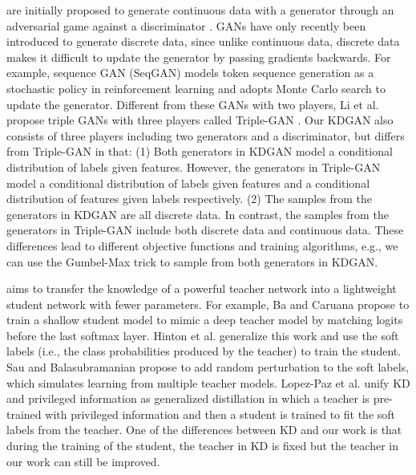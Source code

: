 \documentclass{article}
\begin{document}
 are initially proposed to generate continuous data with a generator through an adversarial game against a discriminator \cite{goodfellow2014generative}.
GANs have only recently been introduced to generate discrete data, since unlike continuous data, discrete data makes it difficult to update the generator by passing gradients backwards.
For example, sequence GAN (SeqGAN) \cite{yu2017seqgan} models token sequence generation as a stochastic policy in reinforcement learning and adopts Monte Carlo search to update the generator.
Different from these GANs with two players, Li et al. propose triple GANs with three players called Triple-GAN \cite{chongxuan2017triple}.
Our KDGAN also consists of three players including two generators and a discriminator, but differs from Triple-GAN in that:
(1) Both generators in KDGAN model a conditional distribution of labels given features.
However, the generators in Triple-GAN model a conditional distribution of labels given features and a conditional distribution of features given labels respectively.
(2) The samples from the generators in KDGAN are all discrete data.
In contrast, the samples from the generators in Triple-GAN include both discrete data and continuous data.
These differences lead to different objective functions and training algorithms, e.g., we can use the Gumbel-Max trick \cite{gumbelstatistical,maddison2014sampling} to sample from both generators in KDGAN.


 aims to transfer the knowledge of a powerful teacher network into a lightweight student network with fewer parameters.
For example, Ba and Caruana \cite{ba2014deep} propose to train a shallow student model to mimic a deep teacher model by matching logits before the last softmax layer.
Hinton et al. \cite{hinton2015distilling} generalize this work and use the soft labels (i.e., the class probabilities produced by the teacher) to train the student.
Sau and Balasubramanian \cite{sau2016deep} propose to add random perturbation to the soft labels, which simulates learning from multiple teacher models.
Lopez-Paz et al. \cite{lopez2015unifying} unify KD \cite{hinton2015distilling} and privileged information \cite{vapnik2015learning} as generalized distillation in which a teacher is pre-trained with privileged information and then a student is trained to fit the soft labels from the teacher.
One of the differences between KD and our work is that during the training of the student, the teacher in KD is fixed but the teacher in our work can still be improved.
\end{document}
